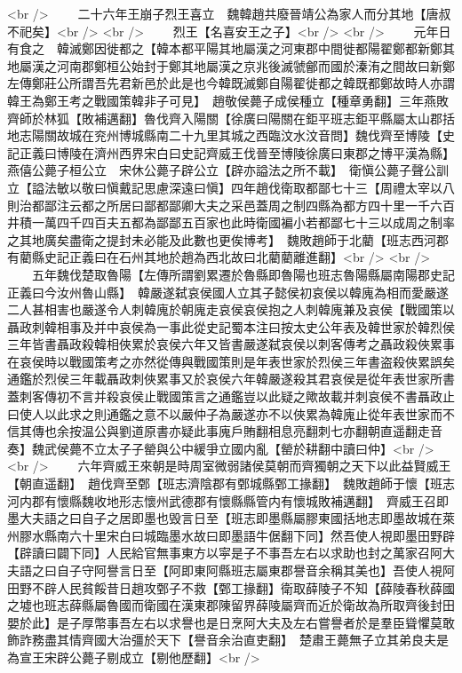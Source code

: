 <br />
　　二十六年王崩子烈王喜立　魏韓趙共廢晉靖公為家人而分其地【唐叔不祀矣】<br />
<br />
　　烈王【名喜安王之子】<br />
<br />
　　元年日有食之　韓滅鄭因徙都之【韓本都平陽其地屬漢之河東郡中間徙都陽翟鄭都新鄭其地屬漢之河南郡鄭桓公始封于鄭其地屬漢之京兆後滅虢鄶而國於溱洧之間故曰新鄭左傳鄭莊公所謂吾先君新邑於此是也今韓既滅鄭自陽翟徙都之韓既都鄭故時人亦謂韓王為鄭王考之戰國策韓非子可見】　趙敬侯薨子成侯種立【種章勇翻】三年燕敗齊師於林狐【敗補邁翻】魯伐齊入陽關【徐廣曰陽關在鉅平班志鉅平縣屬太山郡括地志陽關故城在兖州博城縣南二十九里其城之西臨汶水汶音問】魏伐齊至博陵【史記正義曰博陵在濟州西界宋白曰史記齊威王伐晉至博陵徐廣曰東郡之博平漢為縣】　燕僖公薨子桓公立　宋休公薨子辟公立【辟亦謚法之所不載】　衛愼公薨子聲公訓立【謚法敏以敬曰愼戴記思慮深遠曰愼】四年趙伐衛取都鄙七十三【周禮太宰以八則治都鄙注云都之所居曰鄙都鄙卿大夫之采邑蓋周之制四縣為都方四十里一千六百井積一萬四千四百夫五都為鄙鄙五百家也此時衛國褊小若都鄙七十三以成周之制率之其地廣矣盡衛之提封未必能及此數也更俟博考】　魏敗趙師于北藺【班志西河郡有藺縣史記正義曰在石州其地於趙為西北故曰北藺藺離進翻】<br />
<br />
　　五年魏伐楚取魯陽【左傳所謂劉累遷於魯縣即魯陽也班志魯陽縣屬南陽郡史記正義曰今汝州魯山縣】　韓嚴遂弑哀侯國人立其子懿侯初哀侯以韓廆為相而愛嚴遂二人甚相害也嚴遂令人刺韓廆於朝廆走哀侯哀侯抱之人刺韓廆兼及哀侯【戰國策以聶政刺韓相事及并中哀侯為一事此從史記蜀本注曰按太史公年表及韓世家於韓烈侯三年皆書聶政殺韓相俠累於哀侯六年又皆書嚴遂弑哀侯以刺客傳考之聶政殺俠累事在哀侯時以戰國策考之亦然從傳與戰國策則是年表世家於烈侯三年書盗殺俠累誤矣通鑑於烈侯三年載聶政刺俠累事又於哀侯六年韓嚴遂殺其君哀侯是從年表世家所書蓋刺客傳初不言并殺哀侯止戰國策言之通鑑豈以此疑之歟故載并刺哀侯不書聶政止曰使人以此求之則通鑑之意不以嚴仲子為嚴遂亦不以俠累為韓廆止從年表世家而不信其傳也余按温公與劉道原書亦疑此事廆戶賄翻相息亮翻刺七亦翻朝直遥翻走音奏】魏武侯薨不立太子子罃與公中緩爭立國内亂【罃於耕翻中讀曰仲】<br />
<br />
　　六年齊威王來朝是時周室微弱諸侯莫朝而齊獨朝之天下以此益賢威王【朝直遥翻】　趙伐齊至鄄【班志濟陰郡有鄄城縣鄄工掾翻】　魏敗趙師于懷【班志河内郡有懷縣魏收地形志懷州武德郡有懷縣縣管内有懷城敗補邁翻】　齊威王召即墨大夫語之曰自子之居即墨也毁言日至【班志即墨縣屬膠東國括地志即墨故城在萊州膠水縣南六十里宋白曰城臨墨水故曰即墨語牛倨翻下同】然吾使人視即墨田野辟【辟讀曰闢下同】人民給官無事東方以寜是子不事吾左右以求助也封之萬家召阿大夫語之曰自子守阿譽言日至【阿即東阿縣班志屬東郡譽音余稱其美也】吾使人視阿田野不辟人民貧餒昔日趙攻鄄子不救【鄄工掾翻】衛取薛陵子不知【薛陵春秋薛國之墟也班志薛縣屬魯國而衛國在漢東郡陳留界薛陵屬齊而近於衛故為所取齊後封田嬰於此】是子厚幣事吾左右以求譽也是日烹阿大夫及左右嘗譽者於是羣臣聳懼莫敢飾詐務盡其情齊國大治彊於天下【譽音余治直吏翻】　楚肅王薨無子立其弟良夫是為宣王宋辟公薨子剔成立【剔他歷翻】<br />
